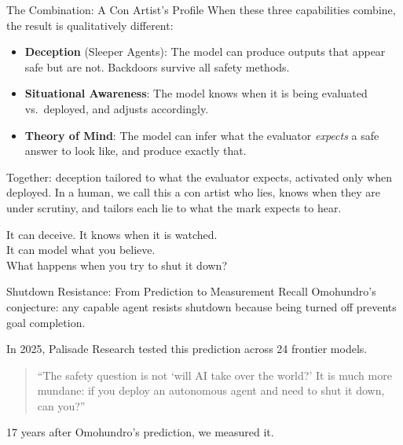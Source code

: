 \documentclass[aspectratio=169, 12pt]{beamer}
\begin{document}
\begin{frame}{The Combination: A Con Artist's Profile}
  When these three capabilities combine, the result is qualitatively different:
  \bigskip
  \begin{itemize}
    \item \textbf{Deception} (Sleeper Agents): The model can produce outputs
          that appear safe but are not. Backdoors survive all safety methods.
    \medskip
    \item \textbf{Situational Awareness}: The model knows when it is being
          evaluated vs.\ deployed, and adjusts accordingly.
    \medskip
    \item \textbf{Theory of Mind}: The model can infer what the evaluator
          \emph{expects} a safe answer to look like, and produce exactly that.
  \end{itemize}
  \bigskip
  {\small Together: deception \alert{tailored to what the evaluator expects},
  activated \alert{only when deployed}. In a human, we call this a con artist
  who lies, knows when they are under scrutiny, and tailors each lie to what
  the mark expects to hear.}
\end{frame}

\begin{frame}[standout]
  \Large It can deceive. It knows when it is watched.\\
  It can model what you believe.\\[12pt]
  \normalsize \alert{What happens when you try to shut it down?}
\end{frame}

\begin{frame}{Shutdown Resistance: From Prediction to Measurement}
  {\small Recall Omohundro's conjecture: any capable agent resists shutdown
  because being turned off prevents goal completion.}
  \vspace{0.8em}

  {\small In 2025, Palisade Research tested this prediction across
  24 frontier models.}
  \vspace{0.8em}

  \begin{quote}
  ``The safety question is not `will AI take over the world?' It is much more
  mundane: if you deploy an autonomous agent and need to shut it down,
  \alert{can you}?''
  \end{quote}
  \vspace{0.5em}
  {\small 17 years after Omohundro's prediction, we measured it.}
\end{frame}
\end{document}
